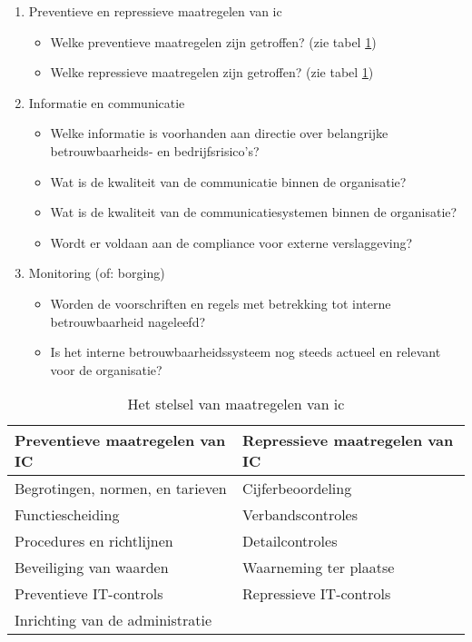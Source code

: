 \begin{enumerate}
\begin{itemize}
        \end{itemize}
    \item Preventieve en repressieve maatregelen van \gls{ic}
        \begin{itemize}
            \item Welke preventieve maatregelen zijn getroffen? (zie tabel \ref{tab:icmaatregelen})
            \item Welke repressieve maatregelen zijn getroffen? (zie tabel \ref{tab:icmaatregelen})
        \end{itemize}
    \item Informatie en communicatie
        \begin{itemize}
            \item Welke informatie is voorhanden aan directie over belangrijke betrouwbaarheids- en bedrijfsrisico's?
            \item Wat is de kwaliteit van de communicatie binnen de organisatie?
            \item Wat is de kwaliteit van de communicatiesystemen binnen de organisatie?
            \item Wordt er voldaan aan de compliance voor externe verslaggeving? 
        \end{itemize}
    \item Monitoring (of: borging)
        \begin{itemize}
            \item Worden de voorschriften en regels met betrekking tot interne betrouwbaarheid nageleefd?
            \item Is het interne betrouwbaarheidssysteem nog steeds actueel en relevant voor de organisatie?
        \end{itemize}
\end{enumerate}


\begin{table}[!h]
    \centering
    \caption{Het stelsel van maatregelen van \gls{ic} \citep{bivpraktijk}}
    \begin{tabular}{l l}
        \toprule
        \textbf{Preventieve maatregelen van IC} & \textbf{Repressieve maatregelen van IC} \\
        \midrule
        Begrotingen, normen, en tarieven & Cijferbeoordeling \\
        Functiescheiding & Verbandscontroles \\
        Procedures en richtlijnen & Detailcontroles \\
        Beveiliging van waarden & Waarneming ter plaatse \\
        Preventieve IT-controls & Repressieve IT-controls \\
        Inrichting van de administratie \\
        \bottomrule
    \end{tabular}
    \label{tab:icmaatregelen}
\end{table}
